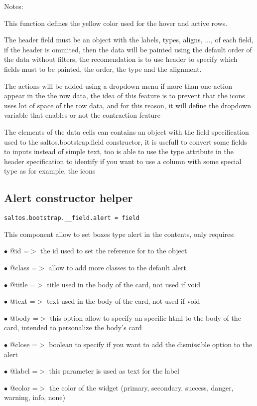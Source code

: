\documentclass[a4paper]{book}
\begin{document}
Notes:

This function defines the yellow color used for the hover and active rows.

The header field must be an object with the labels, types, aligns, ..., of each field,
if the header is ommited, then the data will be painted using the default order of the
data without filters, the recomendation is to use header to specify which fields must
to be painted, the order, the type and the alignment.

The actions will be added using a dropdown menu if more than one action appear in the
the row data, the idea of this feature is to prevent that the icons uses lot of space
of the row data, and for this reason, it will define the dropdown variable that enables
or not the contraction feature

The elements of the data cells can contains an object with the field specification used
to the saltos.bootstrap.field constructor, it is usefull to convert some fields to inputs
instead of simple text, too is able to use the type attribute in the header specification
to identify if you want to use a column with some special type as for example, the icons

\hypertarget{toc485}{}
\subsection{Alert constructor helper}

\begin{lstlisting}
saltos.bootstrap.__field.alert = field
\end{lstlisting}

This component allow to set boxes type alert in the contents, only requires:

\begin{compactitem}
\item[\color{myblue}$\bullet$] @id    =$>$ the id used to set the reference for to the object
\item[\color{myblue}$\bullet$] @class =$>$ allow to add more classes to the default alert
\item[\color{myblue}$\bullet$] @title =$>$ title used in the body of the card, not used if void
\item[\color{myblue}$\bullet$] @text  =$>$ text used in the body of the card, not used if void
\item[\color{myblue}$\bullet$] @body  =$>$ this option allow to specify an specific html to the body of the card, intended
          to personalize the body's card
\item[\color{myblue}$\bullet$] @close =$>$ boolean to specify if you want to add the dismissible option to the alert
\item[\color{myblue}$\bullet$] @label =$>$ this parameter is used as text for the label
\item[\color{myblue}$\bullet$] @color =$>$ the color of the widget (primary, secondary, success, danger, warning, info, none)
\end{compactitem}
\end{document}
